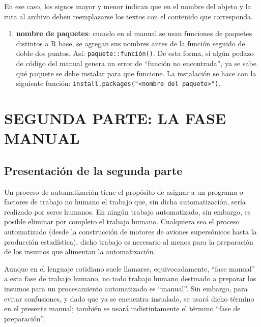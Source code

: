 \documentclass[
  spanish,
]{book}
\providecommand{\tightlist}{%
  \setlength{\itemsep}{0pt}\setlength{\parskip}{0pt}}
\begin{document}
En ese caso, los signos mayor y menor indican que en el nombre del objeto y la ruta al archivo deben reemplazarse los textos con el contenido que corresponda.

\begin{enumerate}
\def\labelenumi{\alph{enumi})}
\setcounter{enumi}{1}
\tightlist
\item
  \textbf{nombre de paquetes}: cuando en el manual se usan funciones de paquetes distintos a R base, se agregan sus nombres antes de la función seguido de doble dos puntos. Así: \texttt{paquete::función()}. De esta forma, si algún pedazo de código del manual genera un error de ``función no encontrada'', ya se sabe qué paquete se debe instalar para que funcione. La instalación se hace con la siguiente función: \texttt{install.packages("\textless{}nombre\ del\ paquete\textgreater{}")}.
\end{enumerate}

\hypertarget{part-segunda-parte-la-fase-manual}{%
\part*{SEGUNDA PARTE: LA FASE MANUAL}\label{part-segunda-parte-la-fase-manual}}

\hypertarget{presentaciuxf3n-de-la-segunda-parte}{%
\chapter*{Presentación de la segunda parte}\label{presentaciuxf3n-de-la-segunda-parte}}

Un proceso de automatización tiene el propósito de asignar a un programa o factores de trabajo no humano el trabajo que, sin dicha automatización, sería realizado por seres humanos. En ningún trabajo automatizado, sin embargo, es posible eliminar por completo el trabajo humano. Cualquiera sea el proceso automatizado (desde la construcción de motores de aviones supersónicos hasta la producción estadística), dicho trabajo es necesario al menos para la preparación de los insumos que alimentan la automatización.

Aunque en el lenguaje cotidiano suele llamarse, equivocadamente, ``fase manual'' a esta fase de trabajo humano, no todo trabajo humano destinado a preparar los insumos para un procesamiento automatizado es ``manual''. Sin embargo, para evitar confusiones, y dado que ya se encuentra instalado, se usará dicho término en el presente manual; también se usará indistintamente el término ``fase de preparación''.
\end{document}
